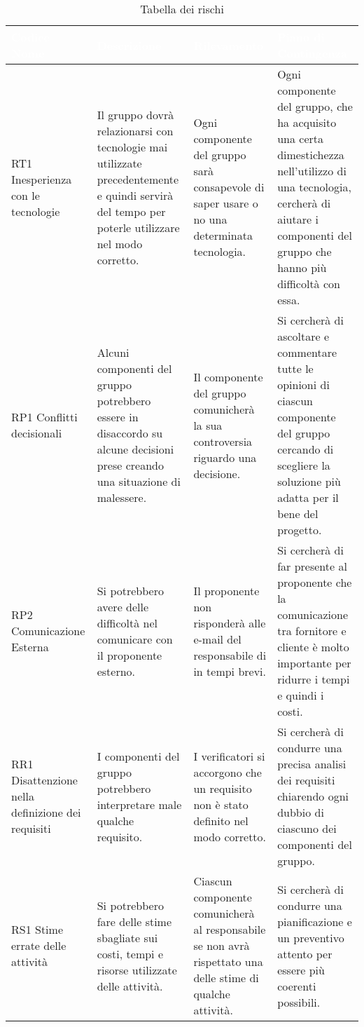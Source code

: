{
\renewcommand{\arraystretch}{2}
\centering
\begin{longtable}{ C{2cm} C{4cm} C{4cm} C{4.9cm}}
\caption{Tabella dei rischi}\\
\textcolor{white}{\textbf{Codice Nome}} & 
\textcolor{white}{\textbf{Descrizione}} & 
\textcolor{white}{\textbf{Rilevamento}} &  
\textcolor{white}{\textbf{Piano di Contingenza}}\\	
\endhead

RT1 Inesperienza con le tecnologie &
Il gruppo dovrà relazionarsi con tecnologie mai utilizzate precedentemente e quindi servirà del tempo per poterle utilizzare nel modo corretto. &
Ogni componente del gruppo sarà consapevole di saper usare o no una determinata tecnologia. &
Ogni componente del gruppo, che ha acquisito una certa dimestichezza nell'utilizzo di una tecnologia, cercherà di aiutare i componenti del gruppo che hanno più difficoltà con essa. \\

RP1 Conflitti decisionali &
Alcuni componenti del gruppo potrebbero essere in disaccordo su alcune decisioni prese creando una situazione di malessere. &
Il componente del gruppo comunicherà la sua controversia riguardo una decisione. &
Si cercherà di ascoltare e commentare tutte le opinioni di ciascun componente del gruppo cercando di scegliere la soluzione più adatta per il bene del progetto. \\ 

RP2 Comunicazione Esterna &
Si potrebbero avere delle difficoltà nel comunicare con il proponente esterno. &
Il proponente non risponderà alle e-mail del responsabile di \Gruppo{} in tempi brevi. &
Si cercherà di far presente al proponente \Proponente{} che la comunicazione tra fornitore e cliente è molto importante per ridurre i tempi e quindi i costi. \\

RR1 Disattenzione nella definizione dei requisiti &
I componenti del gruppo potrebbero interpretare male qualche requisito. &
I verificatori si accorgono che un requisito non è stato definito nel modo corretto. &
Si cercherà di condurre una precisa analisi dei requisiti chiarendo ogni dubbio di ciascuno dei componenti del gruppo. \\

RS1 Stime errate delle attività &
Si potrebbero fare delle stime sbagliate sui costi, tempi e risorse utilizzate delle attività. &
Ciascun componente comunicherà al responsabile se non avrà rispettato una delle stime di qualche attività. &
Si cercherà di condurre una pianificazione e un preventivo attento per essere più coerenti possibili. \\


\end{longtable}}
